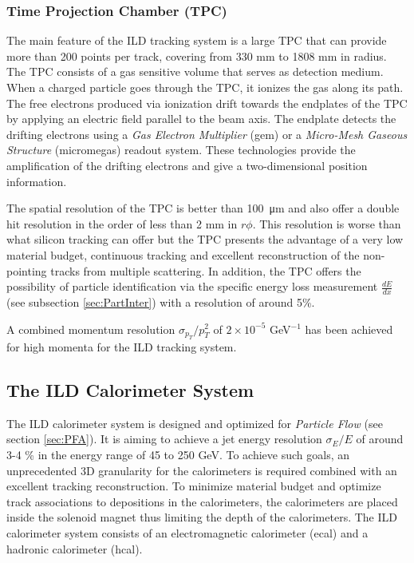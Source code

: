 \subsubsection{Time Projection Chamber (TPC)}

The main feature of the ILD tracking system is a large TPC that can provide more than 200 points per track, covering from 330 mm to 1808 mm in radius. The TPC consists of a gas sensitive volume that serves as detection medium. When a charged particle goes through the TPC, it ionizes the gas along its path. The free electrons produced via ionization drift towards the endplates of the TPC by applying an electric field parallel to the beam axis. The endplate detects the drifting electrons using a \textit{Gas Electron Multiplier} (\acrshort{gem}) \cite{Sauli:1997qp} or a \textit{Micro-Mesh Gaseous Structure} (\acrshort{micromegas}) \cite{Giomataris:1995fq} readout system. These technologies provide the amplification of the drifting electrons and give a two-dimensional position information.

The spatial resolution of the TPC is better than \SI{100}{\micro\meter} \cite{Mueller:301339} and also offer a double hit resolution in the order of less than 2 mm in $r\phi$. This resolution is worse than what silicon tracking can offer but the TPC presents the advantage of a very low material budget, continuous tracking and excellent reconstruction of the non-pointing tracks from multiple scattering. In addition, the TPC offers the possibility of particle identification via the specific energy loss measurement $\frac{dE}{dx}$ (see subsection \ref{sec:PartInter}) with a resolution of around 5\%.

A combined momentum resolution $\sigma_{p_T}/p_T^2$ of $2 \times 10^{-5}$ GeV$^{-1}$ has been achieved for high momenta for the ILD tracking system.

\subsection{The ILD Calorimeter System}

The ILD calorimeter system is designed and optimized for \textit{Particle Flow} (see section \ref{sec:PFA}). It is aiming to achieve a jet energy resolution $\sigma_E/E$ of around 3-4 \% in the energy range of 45 to 250 GeV. To achieve such goals, an unprecedented 3D granularity for the calorimeters is required combined with an excellent tracking reconstruction. To minimize material budget and optimize track associations to depositions in the calorimeters, the calorimeters are placed inside the solenoid magnet thus limiting the depth of the calorimeters. The ILD calorimeter system consists of an electromagnetic calorimeter (\acrshort{ecal}) and a hadronic calorimeter (\acrshort{hcal}).

